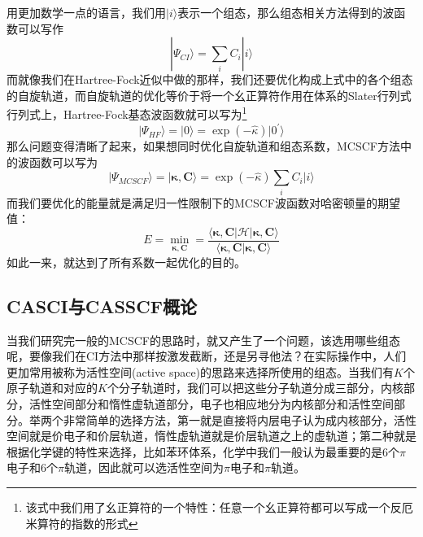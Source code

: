 \documentclass[12pt,a4paper,openany,twoside]{book}
\numberwithin{equation}{section}
\begin{document}
          用更加数学一点的语言，我们用$|i\rangle$表示一个组态，那么组态相关方法得到的波函数可以写作
          \begin{equation}
            | \Psi_{CI} \rangle = \sum_i C_i | i \rangle
          \end{equation}
          而就像我们在Hartree-Fock近似中做的那样，我们还要优化构成上式中的各个组态的自旋轨道，而自旋轨道的优化等价于将一个幺正算符作用在体系的Slater行列式行列式上，Hartree-Fock基态波函数就可以写为\footnote{该式中我们用了幺正算符的一个特性：任意一个幺正算符都可以写成一个反厄米算符的指数的形式}
          \begin{equation}
            |\Psi_{HF}\rangle = | 0 \rangle = \exp(-\hat{\kappa}) | 0^{\prime} \rangle
          \end{equation}
          那么问题变得清晰了起来，如果想同时优化自旋轨道和组态系数，MCSCF方法中的波函数可以写为
          \begin{equation}
            | \Psi_{MCSCF} \rangle = | \mathbf{\kappa}, \mathbf{C} \rangle=\exp(-\hat{\kappa}) \sum_i C_i | i \rangle
            \label{MCSCF wavefunction}
          \end{equation}
          而我们要优化的能量就是满足归一性限制下的MCSCF波函数对哈密顿量的期望值：
          \begin{equation}
            E = \min_{\mathbf{\kappa}, \mathbf{C}} = \frac{\langle \mathbf{\kappa}, \mathbf{C} | \mathscr{H} | \mathbf{\kappa}, \mathbf{C} \rangle }{\langle \mathbf{\kappa}, \mathbf{C} | \mathbf{\kappa}, \mathbf{C} \rangle }
            \label{MCSCF energy}
          \end{equation}
          如此一来，就达到了所有系数一起优化的目的。
        \subsection{CASCI与CASSCF概论}
          当我们研究完一般的MCSCF的思路时，就又产生了一个问题，该选用哪些组态呢，要像我们在CI方法中那样按激发截断，还是另寻他法？在实际操作中，人们更加常用被称为活性空间(active space)的思路来选择所使用的组态。当我们有$K$个原子轨道和对应的$K$个分子轨道时，我们可以把这些分子轨道分成三部分，内核部分，活性空间部分和惰性虚轨道部分，电子也相应地分为内核部分和活性空间部分。举两个非常简单的选择方法，第一就是直接将内层电子认为成内核部分，活性空间就是价电子和价层轨道，惰性虚轨道就是价层轨道之上的虚轨道；第二种就是根据化学键的特性来选择，比如苯环体系，化学中我们一般认为最重要的是6个$\pi$电子和6个$\pi$轨道，因此就可以选活性空间为$\pi$电子和$\pi$轨道。
          
\end{document}

